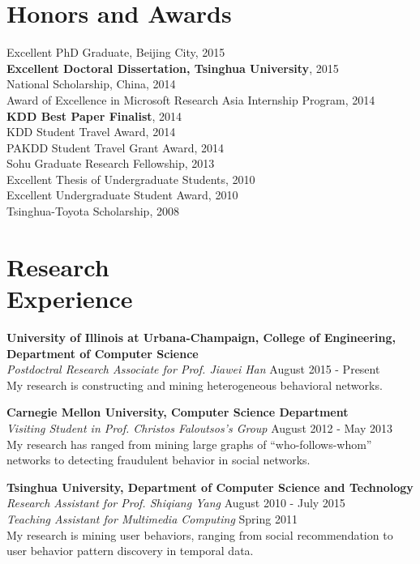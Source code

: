 \documentclass[margin, 10pt]{res} %
\begin{document}
\begin{resume}
\section{Honors and Awards}

{Excellent PhD Graduate, Beijing City}, 2015 \\
{\bf Excellent Doctoral Dissertation, Tsinghua University}, 2015 \\
{National Scholarship, China}, 2014 \\
{Award of Excellence in Microsoft Research Asia Internship Program}, 2014 \\
{\bf KDD Best Paper Finalist}, 2014 \\
{KDD Student Travel Award}, 2014 \\
{PAKDD Student Travel Grant Award}, 2014 \\
{Sohu Graduate Research Fellowship}, 2013 \\
{Excellent Thesis of Undergraduate Students}, 2010 \\
{Excellent Undergraduate Student Award}, 2010 \\
{Tsinghua-Toyota Scholarship}, 2008


\section{Research \\ Experience}

{\bf University of Illinois at Urbana-Champaign, College of Engineering, Department of Computer Science} \\
{\em Postdoctral Research Associate for Prof. Jiawei Han} \hfill {August 2015 - Present} \\
My research is constructing and mining heterogeneous behavioral networks.

{\bf Carnegie Mellon University, Computer Science Department} \\
{\em Visiting Student in Prof. Christos Faloutsos's Group} \hfill {August 2012 - May 2013} \\
My research has ranged from mining large graphs of ``who-follows-whom'' networks to detecting fraudulent behavior in social networks.

{\bf Tsinghua University, Department of Computer Science and Technology} \\
{\em Research Assistant for Prof. Shiqiang Yang} \hfill {August 2010 - July 2015} \\
{\em Teaching Assistant for Multimedia Computing} \hfill {Spring 2011} \\
My research is mining user behaviors, ranging from social recommendation to user behavior pattern discovery in temporal data.


\end{resume}
\end{document}
